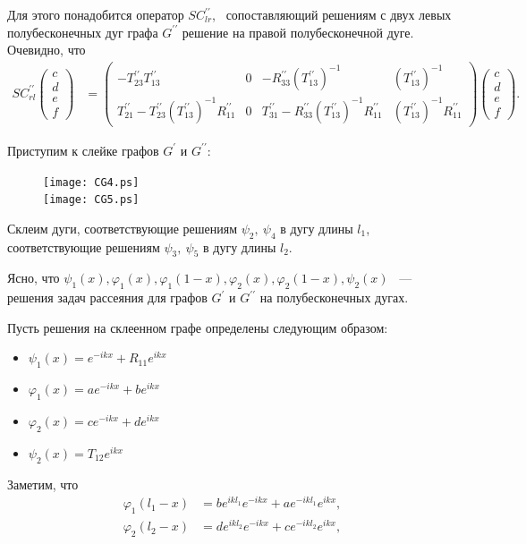 \documentclass[a4 paper, 12 pt]{extarticle}
\begin{document}
   Для этого понадобится оператор $SC_{lr}^{\prime\prime}$, \ сопоставляющий решениям с двух левых полубесконечных дуг графа $G^{\prime\prime}$ решение на правой полубесконечной дуге. Очевидно, что
    \[
   \begin{aligned}
   SC_{rl}^{\prime\prime}\left(
   \begin{array}{c}
   c \\
   d \\
   e \\
   f
   \end{array}\right) &= \left(\begin{array}{cccc}
   -T_{23}^{\prime\prime} T_{13}^{\prime\prime} & 0 & -R_{33}^{\prime\prime} \left(T_{13}^{\prime\prime}\right)^{-1} & \left(T_{13}^{\prime\prime}\right)^{-1} \\
   T_{21}^{\prime\prime}- T_{23}^{\prime\prime}\left(T_{13}^{\prime\prime}\right)^{-1}R_{11}^{\prime\prime} & 0 & T_{31}^{\prime\prime} - R_{33}^{\prime\prime} \left(T_{13}^{\prime\prime}\right)^{-1}R_{11}^{\prime\prime} & \left(T_{13}^{\prime\prime}\right)^{-1}R_{11}^{\prime\prime}
   \end{array}\right)
   \left(\begin{array}{c}
   c \\
   d \\
   e \\
   f
   \end{array}\right).
   \end{aligned}\]
   
   Приступим к слейке графов $G^\prime$ и $G^{\prime \prime}$:
   \begin{figure}[!htb]
   	\centering
   	\texttt{[image: CG4.ps]} \\
   	\texttt{[image: CG5.ps]}
   \end{figure}
   
   Склеим дуги, соответствующие решениям $\psi_2, \ \psi_4$ в дугу длины $l_1$, соответствующие решениям $\psi_3, \ \psi_5$ в дугу длины $l_2$.
   
   Ясно, что $\psi_1\left(x\right), \varphi_1\left(x\right), \varphi_1\left(1-x\right), \varphi_2\left(x\right), \varphi_2\left(1-x\right), \psi_2\left(x\right)$ ~--- решения задач рассеяния для графов  $G^\prime$ и $G^{\prime \prime}$ на полубесконечных дугах.
   
   Пусть решения на склеенном графе определены следующим образом:
   \begin{itemize}
   	\item $ \psi_1\left(x\right) = e^{-ikx} + R_{11} e^{ikx} $
   	\item $ \varphi_1\left(x\right)  = a e^{-ikx} + b e^{ikx} $
   	\item $ \varphi_2\left(x\right) = c e^{-ikx} + d e^{ikx} $
   	\item $ \psi_2\left(x\right) = T_{12} e^{ikx}$
   \end{itemize}
    Заметим, что
   \[
   \begin{aligned}
   \varphi_1\left(l_1-x\right) &= b e^{ikl_1} e^{-ikx} + a e^{-ikl_1} e^{ikx}, \\
   \varphi_2\left(l_2-x\right) &= d e^{ikl_2} e^{-ikx} + c e^{-ikl_2} e^{ikx},
   \end{aligned}\]
   
\end{document}
